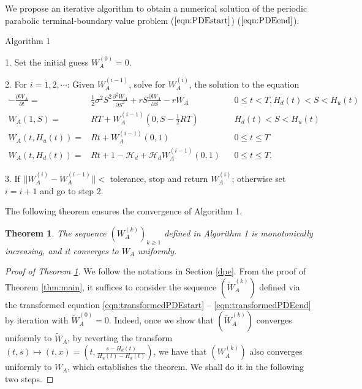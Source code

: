 \documentclass[11pt]{article}%
\numberwithin{equation}{section}
\theoremstyle{plain}
\newtheorem{theorem}{Theorem}[section]
\begin{document}
\begin{appendices}
We propose an iterative algorithm to obtain a numerical solution of the periodic parabolic terminal-boundary value problem ($\ref{eqn:PDEstart}$) \textendash{} ($\ref{eqn:PDEend}$).

\begin{center}
Algorithm 1
\end{center}

1. Set the initial guess $W_{A}^{(0)}=0$.

2.  For $i=1,2,\cdots$: Given $W_{A}^{(i-1)}$, solve for $W_{A}^{(i)}$, the solution to the equation
\begin{align*}
-\frac{\partial W_{A}}{\partial t}= & \frac{1}{2}\sigma^{2}S^{2}\frac{\partial^{2}W_{A}}{\partial S^{2}}+r S\frac{\partial W_{A}}{\partial S}-r W_{A} &  & 0\le t<T,H_{d}(t)<S<H_{u}(t)\\
W_{A}(1,S)= & RT+W_{A}^{(i-1)}(0,S-\frac{1}{2}RT) &  & H_{d}(t)<S<H_{u}(t)\\
W_{A}(t,H_{u}(t))= & Rt+W_{A}^{(i-1)}(0,1) &  & 0\le t\le T\\
W_{A}(t,H_{d}(t))= & Rt+1-\mathcal{H}_{d}+\mathcal{H}_{d}W_{A}^{(i-1)}(0,1) &  & 0\le t\le T.
\end{align*}


3.  If $||W_{A}^{(i)}-W_{A}^{(i-1)}||<$ tolerance, stop and return $W_{A}^{(i)}$; otherwise set $i=i+1$ and go to step 2.

The following theorem ensures the convergence of Algorithm 1.

\begin{theorem}\label{thm:convergence}
	The sequence $(W_A^{(k)})_{k\ge 1}$ defined in Algorithm 1 is monotonically increasing, and it converges to $W_A$ uniformly.
\end{theorem}
\begin{proof}[Proof of Theorem \ref{thm:convergence}]
	We follow the notations in Section \ref{dpe}. From the proof of Theorem \ref{thm:main}, it suffices to consider the sequence $(\tilde{W}_A^{(k)})$ defined via the transformed equation \eqref{eqn:transformedPDEstart} -- \eqref{eqn:transformedPDEend} by iteration with $\tilde{W}_A^{(0)}=0$. Indeed, once we show that $(\tilde{W}_A^{(k)})$ converges uniformly to $\tilde{W}_A$, by reverting the transform $(t,s)\mapsto(t,x)=\left(t,\frac{s-H_d(t)}{H_u(t)-H_d(t)}\right)$, we have that $(W_{A}^{(k)})$ also converges uniformly to $W_A$, which establishes the theorem. We shall do it in the following two steps.


\end{proof}
\end{appendices}
\end{document}
